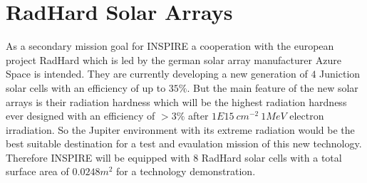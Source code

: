 \section{RadHard Solar Arrays}
\label{subsec:radhard}
As a secondary mission goal for INSPIRE a cooperation with the european project RadHard which is led by the german solar array manufacturer Azure Space is intended. They are currently developing a new generation of $4$ Juniction solar cells with an efficiency of up to $35 \% $. But the main feature of the new solar arrays is their radiation hardness which will be the highest radiation hardness ever designed with an efficiency of $>3 \% $ after $1E15 \ cm^{-2} \ 1MeV$ electron irradiation. So the Jupiter environment with its extreme radiation would be the best suitable destination for a test and evaulation mission of this new technology. Therefore INSPIRE will be equipped with $8$ RadHard solar cells with a total surface area of $0.0248 m^2$ for a technology demonstration\cite{FraunhoferInstituteforSolarEnergySystemsISE.2021}.

